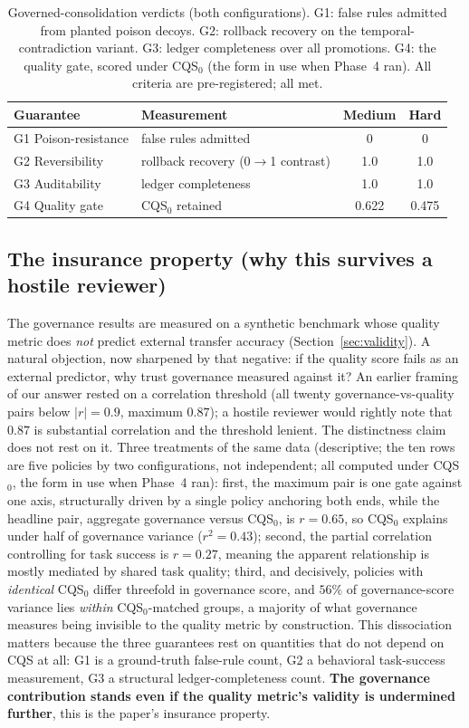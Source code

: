 \documentclass[11pt]{article}
\newcommand{\cqs}{\textsc{CQS}}
\newcommand{\cqsz}{\textsc{CQS}\ensuremath{_0}}
\begin{document}
\begin{table}[h]\centering\small
\caption{Governed-consolidation verdicts (both configurations). G1: false rules
admitted from planted poison decoys. G2: rollback recovery on the
temporal-contradiction variant. G3: ledger completeness over all promotions. G4: the
quality gate, scored under \cqsz{} (the form in use when Phase~4 ran). All criteria are
pre-registered; all met.}
\label{tab:gov}
\begin{tabular}{llcc}
\toprule
Guarantee & Measurement & Medium & Hard \\
\midrule
G1 Poison-resistance & false rules admitted & 0 & 0 \\
G2 Reversibility & rollback recovery (0$\to$1 contrast) & 1.0 & 1.0 \\
G3 Auditability & ledger completeness & 1.0 & 1.0 \\
G4 Quality gate & \cqsz{} retained & 0.622 & 0.475 \\
\bottomrule
\end{tabular}
\end{table}

\subsection{The insurance property (why this survives a hostile reviewer)}
\label{sec:insurance}
The governance results are measured on a synthetic benchmark whose quality metric does
\emph{not} predict external transfer accuracy (Section~\ref{sec:validity}). A natural
objection, now sharpened by that negative: if the quality score fails as an external
predictor, why trust governance measured against it? An earlier framing of our answer rested on a correlation
threshold (all twenty governance-vs-quality pairs below $|r| = 0.9$, maximum $0.87$);
a hostile reviewer would rightly note that $0.87$ is substantial correlation and the
threshold lenient. The distinctness claim does not rest on it. Three treatments of the
same data (descriptive; the ten rows are five policies by two configurations, not
independent; all computed under \cqsz{}, the form in use when Phase~4 ran): first, the
maximum pair is one gate against one axis, structurally driven by a single policy
anchoring both ends, while the headline pair, aggregate governance versus \cqsz{}, is
$r = 0.65$, so \cqsz{} explains under half of governance variance ($r^2 = 0.43$);
second, the partial correlation controlling for task success is $r = 0.27$, meaning the
apparent relationship is mostly mediated by shared task quality; third, and decisively,
policies with \emph{identical} \cqsz{} differ threefold in governance score, and $56\%$
of governance-score variance lies \emph{within} \cqsz{}-matched groups, a majority of
what governance measures being invisible to the quality metric by construction. This dissociation matters because the three guarantees
rest on quantities that do not depend on \cqs{} at all: G1 is a ground-truth
false-rule count, G2 a behavioral task-success measurement, G3 a structural
ledger-completeness count. \textbf{The governance contribution stands even if the
quality metric's validity is undermined further}, this is the paper's insurance
property.
\end{document}
